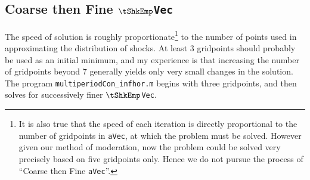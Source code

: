 \documentclass[titlepage]{\econtex}
\begin{document}

  \subsection{Coarse then Fine \texttt{$\tShkEmp$Vec}}

  The speed of solution is roughly proportionate\footnote{It is also
    true that the speed of each iteration is directly proportional to
    the number of gridpoints in \texttt{aVec}, at which the problem must
    be solved. However given our method of moderation, now the problem
    could be solved very precisely based on five gridpoints only. Hence
    we do not pursue the process of ``Coarse then Fine \texttt{aVec}''.}
  to the number of points used in approximating the distribution of
  shocks.  At least 3 gridpoints should probably be used as an initial
  minimum, and my experience is that increasing the number of gridpoints
  beyond 7 generally yields only very small changes in the solution.  The program
  \texttt{multiperiodCon\_infhor.m}
  begins with three gridpoints, and then solves for successively finer
  \texttt{$\tShkEmp$Vec}.
\end{document}
